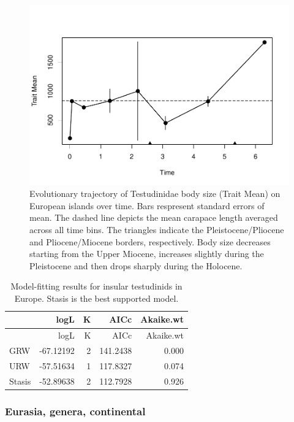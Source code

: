 \begin{figure}[H]
	\centering
	\includegraphics{MA_JJ_files/figure-latex/pTSEuI-1.pdf}
	\caption[PaleoTS plot of insular \T in Europe]{Evolutionary trajectory of Testudinidae body size (Trait Mean) on European islands over time. Bars respresent standard errors of mean. The dashed line depicts the mean carapace length averaged across all time bins. The triangles indicate the Pleistocene/Pliocene and Pliocene/Miocene borders, respectively. Body size decreases starting from the Upper Miocene, increases slightly during the Pleistocene and then drops sharply during the Holocene.
	}
	\label{fig:pTSEuI}
\end{figure}

\begin{longtable}[]{@{}lrrrr@{}}
	\caption[Model fits for insular \T in Europe]{Model-fitting results for insular testudinids in Europe. Stasis is the best supported model.}
	\label{tab:pTSEuIEM}\tabularnewline
	\toprule
	& logL & K & AICc & Akaike.wt\tabularnewline
	\midrule
	\endfirsthead
	\toprule
	& logL & K & AICc & Akaike.wt\tabularnewline
	\midrule
	\endhead
	GRW & -67.12192 & 2 & 141.2438 & 0.000\tabularnewline
	URW & -57.51634 & 1 & 117.8327 & 0.074\tabularnewline
	Stasis & -52.89638 & 2 & 112.7928 & 0.926\tabularnewline
	\bottomrule
\end{longtable}

\FloatBarrier




\subsubsection*{Eurasia, genera,
	continental}\label{eurasiagenera-continental}


